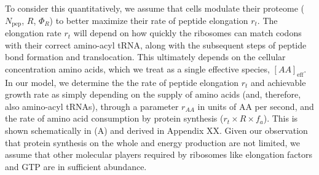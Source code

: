 
To consider this quantitatively, we assume that cells modulate their proteome
($N_\text{pep}$, $R$, $\Phi_R$) to better maximize their rate of peptide
elongation $r_t$. The elongation rate $r_t$ will depend on how quickly the ribosomes can
match codons with their correct amino-acyl tRNA, along with the subsequent steps
of peptide bond formation and translocation. This ultimately depends on the
cellular concentration amino acids, which we treat as a single effective
species, $[AA]_\text{eff}$. In our model, we determine the the rate of peptide
elongation $r_t$ and achievable growth rate as simply depending on the supply of
amino acids (and, therefore, also amino-acyl tRNAs), through a parameter
$r_{AA}$ in units of AA per second, and the rate of amino acid consumption by
protein synthesis ($r_t \times R \times f_a$). This is shown schematically in
(A) and derived in Appendix XX. Given our observation
that protein synthesis on the whole and energy production are not limited, we
assume that other molecular players required by ribosomes like elongation
factors and GTP are in sufficient abundance.

%

